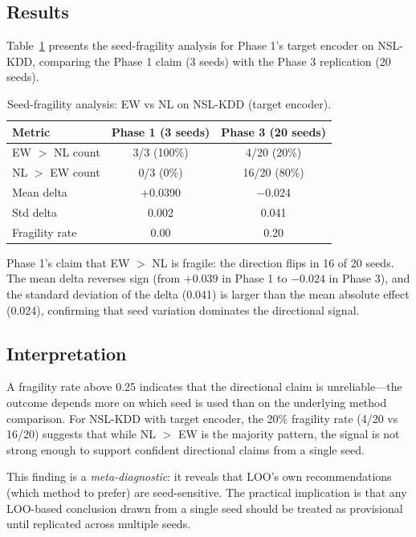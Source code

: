 \subsection{Results}

Table~\ref{tab:fragility} presents the seed-fragility analysis for Phase 1's target encoder on NSL-KDD, comparing the Phase 1 claim (3 seeds) with the Phase 3 replication (20 seeds).

\begin{table}[h]
\centering
\caption{Seed-fragility analysis: EW vs NL on NSL-KDD (target encoder).}
\label{tab:fragility}
\begin{tabular}{lcc}
\toprule
Metric & Phase 1 (3 seeds) & Phase 3 (20 seeds) \\
\midrule
EW $>$ NL count & 3/3 (100\%) & 4/20 (20\%) \\
NL $>$ EW count & 0/3 (0\%) & 16/20 (80\%) \\
Mean delta & +0.0390 & $-$0.024 \\
Std delta & 0.002 & 0.041 \\
Fragility rate & 0.00 & 0.20 \\
\bottomrule
\end{tabular}
\end{table}

Phase 1's claim that EW $>$ NL is fragile: the direction flips in 16 of 20 seeds. The mean delta reverses sign (from $+0.039$ in Phase 1 to $-0.024$ in Phase 3), and the standard deviation of the delta (0.041) is larger than the mean absolute effect (0.024), confirming that seed variation dominates the directional signal.

\subsection{Interpretation}

A fragility rate above 0.25 indicates that the directional claim is unreliable---the outcome depends more on which seed is used than on the underlying method comparison. For NSL-KDD with target encoder, the 20\% fragility rate (4/20 vs 16/20) suggests that while NL $>$ EW is the majority pattern, the signal is not strong enough to support confident directional claims from a single seed.

This finding is a \emph{meta-diagnostic}: it reveals that LOO's own recommendations (which method to prefer) are seed-sensitive. The practical implication is that any LOO-based conclusion drawn from a single seed should be treated as provisional until replicated across multiple seeds.

